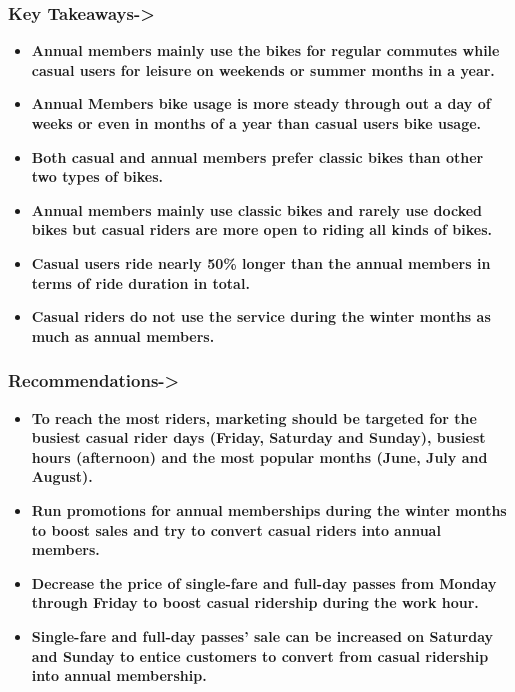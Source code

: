 \documentclass[
]{article}
\begin{document}
\hypertarget{key-takeaways-}{%
\subsubsection{\texorpdfstring{\textbf{Key
Takeaways-\textgreater{}}}{Key Takeaways-\textgreater{}}}\label{key-takeaways-}}

\begin{itemize}
\item
  \textbf{Annual members mainly use the bikes for regular commutes while
  casual users for leisure on weekends or summer months in a year.}
\item
  \textbf{Annual Members bike usage is more steady through out a day of
  weeks or even in months of a year than casual users bike usage.}
\item
  \textbf{Both casual and annual members prefer classic bikes than other
  two types of bikes.}
\item
  \textbf{Annual members mainly use classic bikes and rarely use docked
  bikes but casual riders are more open to riding all kinds of bikes.}
\item
  \textbf{Casual users ride nearly 50\% longer than the annual members
  in terms of ride duration in total.}
\item
  \textbf{Casual riders do not use the service during the winter months
  as much as annual members.}
\end{itemize}

\hypertarget{recommendations-}{%
\subsubsection{\texorpdfstring{\textbf{Recommendations-\textgreater{}}}{Recommendations-\textgreater{}}}\label{recommendations-}}

\begin{itemize}
\item
  \textbf{To reach the most riders, marketing should be targeted for the
  busiest casual rider days (Friday, Saturday and Sunday), busiest hours
  (afternoon) and the most popular months (June, July and August).}
\item
  \textbf{Run promotions for annual memberships during the winter months
  to boost sales and try to convert casual riders into annual members.}
\item
  \textbf{Decrease the price of single-fare and full-day passes from
  Monday through Friday to boost casual ridership during the work hour.}
\item
  \textbf{Single-fare and full-day passes' sale can be increased on
  Saturday and Sunday to entice customers to convert from casual
  ridership into annual membership.}
\end{itemize}
\end{document}
